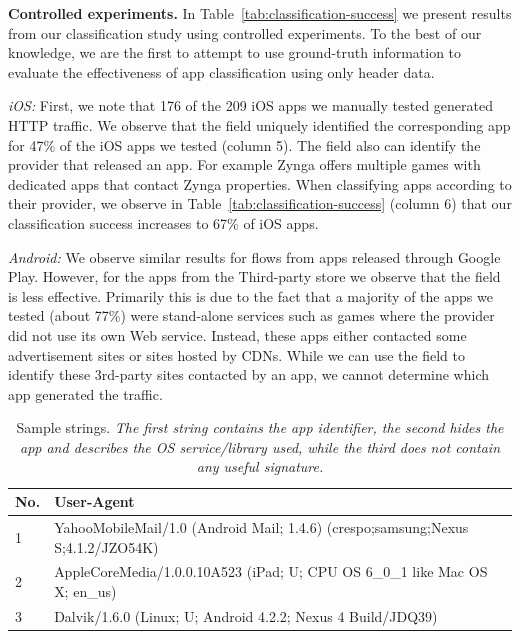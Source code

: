 
\noindent\textbf{Controlled experiments.}
In Table~\ref{tab:classification-success} we present results from our classification study using controlled experiments. To 
the best of our knowledge, we are the first to attempt to use ground-truth information to evaluate the 
effectiveness of app classification using only header data.
 

\emph{iOS:}
First, we note that 176 of the 209 iOS apps we manually tested generated HTTP traffic.
We observe that the \httphost field uniquely identified the corresponding app for 47\% of the iOS apps we tested (column 5).
The \httphost field also can identify the provider that released an app.
For example Zynga offers multiple games with dedicated apps that contact Zynga properties.
When classifying apps according to their provider, we observe in Table~\ref{tab:classification-success} (column 6) that our classification success increases to 67\% of iOS apps. 


\emph{Android:} We observe similar results for flows from apps released through Google Play.
However, for the apps from the Third-party store we observe that the \httphost field is less effective. 
Primarily this is due to the fact that a majority of the apps we tested (about 77\%) were stand-alone services such as games where the provider did not use its own Web service. Instead, these apps either contacted some advertisement sites or sites hosted by CDNs. 
While we can use the \httphost field to identify these 3rd-party sites contacted by an app, we cannot determine which app generated the traffic. 

\begin{table}
\begin{small}
\begin{tabular}{|l|p{}|}
\hline
{\bf No. } & {\bf User-Agent}\tabularnewline
\hline
1 & YahooMobileMail/1.0 (Android Mail; 1.4.6) (crespo;samsung;Nexus S;4.1.2/JZO54K)\tabularnewline
\hline
2 & AppleCoreMedia/1.0.0.10A523 (iPad; U; CPU OS 6\_0\_1 like Mac OS X; en\_us) \tabularnewline
\hline
3 & Dalvik/1.6.0 (Linux; U; Android 4.2.2; Nexus 4 Build/JDQ39) \tabularnewline
\hline
\end{tabular}
\end{small}
\caption{Sample \useragent strings. \emph{The first string contains the app identifier, the second hides the app and describes the OS service/library used, while the third does not contain any useful signature.}}
\label{tab:user-agent}
\end{table}

